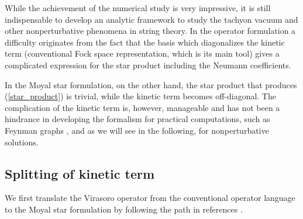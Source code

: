 \documentclass[a4paper,aps,preprint,nofootinbib,eqsecnum]{revtex4}
\begin{document}
While the achievement of the numerical study is very impressive, it is still
indispensable to develop an analytic framework to study the tachyon vacuum
and other nonperturbative phenomena in string theory. In the operator
formulation a difficulty originates from the fact that the basis which
diagonalizes the kinetic term (conventional Fock space representation, which
is its main tool) gives a complicated expression for the star product
including the Neumann coefficients.

In the Moyal star formulation, on the other hand, the star product that
produces (\ref{star_product}) is trivial, while the kinetic term becomes
off-diagonal. The complication of the kinetic term is, however, manageable
and has not been a hindrance in developing the formalism for practical
computations, such as Feynman graphs \cite{BKM1}, and as we will see in the
following, for nonperturbative solutions.

\subsection{Splitting of kinetic term}
\label{sub:splitting}

We first translate the Virasoro operator from the conventional operator
language to the Moyal star formulation by following the path in references
\cite{BM2,BKM1,PREP}.
\end{document}
